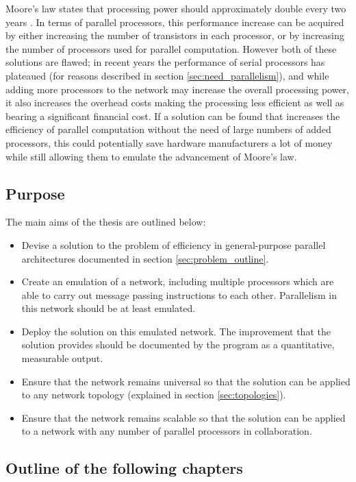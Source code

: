 \documentclass[a4paper, 12pt]{article}
\begin{document}
Moore's law states that processing power should approximately double every two years \cite{Moo65}. In terms of parallel processors, this performance increase can be acquired by either increasing the number of transistors in each processor, or by increasing the number of processors used for parallel computation. However both of these solutions are flawed; in recent years the performance of serial processors has plateaued (for reasons described in section \ref{sec:need_parallelism}), and while adding more processors to the network may increase the overall processing power, it also increases the overhead costs making the processing less efficient as well as bearing a significant financial cost. If a solution can be found that increases the efficiency of parallel computation without the need of large numbers of added processors, this could potentially save hardware manufacturers a lot of money while still allowing them to emulate the advancement of Moore's law.

\subsection{Purpose}

The main aims of the thesis are outlined below:
\begin{itemize}
	\item Devise a solution to the problem of efficiency in general-purpose parallel architectures documented in section \ref{sec:problem_outline}.
	\item Create an emulation of a network, including multiple processors which are able to carry out message passing instructions to each other. Parallelism in this network should be at least emulated.
	\item Deploy the solution on this emulated network. The improvement that the solution provides should be documented by the program as a quantitative, measurable output.
	\item Ensure that the network remains universal so that the solution can be applied to any network topology (explained in section \ref{sec:topologies}).
	\item Ensure that the network remains scalable so that the solution can be applied to a network with any number of parallel processors in collaboration.
\end{itemize}

\subsection{Outline of the following chapters}
\end{document}
